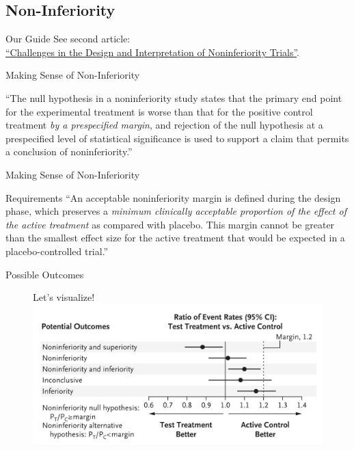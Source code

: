 \documentclass{beamer}
\newcommand{\nonInf}{\href{https://doi.org/10.1056/NEJMra1510063}{``Challenges in the Design and Interpretation of Noninferiority Trials''}}
\begin{document}
	\subsection{Non-Inferiority}
		\begin{frame}{Our Guide}
			See second article: \\
			\nonInf. \cite{drazen_challenges_2017}
		\end{frame}
		\begin{frame}{Making Sense of Non-Inferiority}
			\begin{definition}
				``The null hypothesis in a noninferiority study states that the primary end point for the experimental treatment is worse than that for the positive control treatment \textit{by a prespecified margin}, and rejection of the null hypothesis at a prespecified level of statistical significance is used to support a claim that permits a conclusion of noninferiority.''
			\end{definition}
		\end{frame}
		\begin{frame}{Making Sense of Non-Inferiority}
			\begin{alertblock}{Requirements}
				``An acceptable noninferiority margin is defined during the design phase, which preserves a \textit{minimum clinically acceptable proportion of the effect of the active treatment} as compared with placebo. This margin cannot be greater than the smallest effect size for the active treatment that would be expected in a placebo-controlled trial.''
			\end{alertblock}
		\end{frame}
		\begin{frame}{Possible Outcomes}
			\begin{figure}
				Let's visualize!
				\centering
				\includegraphics[width=1.0\textwidth]{../reports/figures/noninferiority-outcomes}
				\label{fig:noninferiority-outcomes}
			\end{figure}
		\end{frame}
\end{document}
